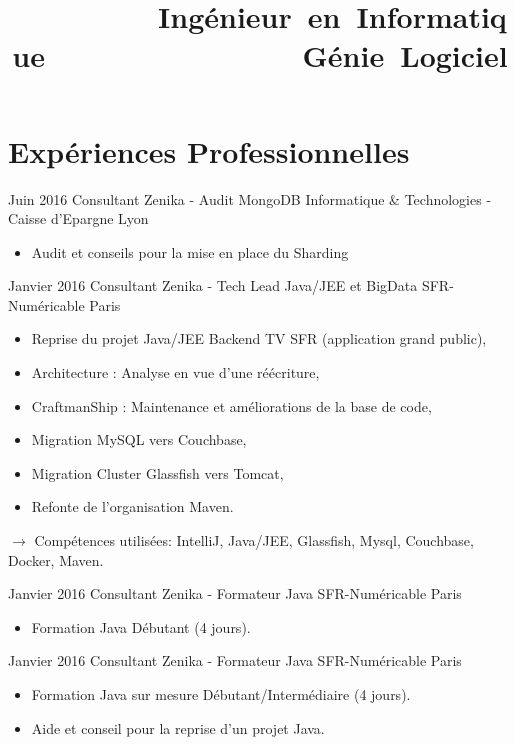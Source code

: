 \documentclass[11pt,a4paper]{moderncv}
\title{\mbox{~~~~~~~~~Ingénieur en Informatique}\newline\mbox{~~~~~~~~~~~~~~~~Génie Logiciel}} %
\begin{document}
\maketitle

\section{Expériences Professionnelles}

\cventry
{Juin 2016}
{Consultant Zenika - Audit MongoDB}
{Informatique \& Technologies - Caisse d'Epargne}
{Lyon}
{}
{\begin{itemize}
\item Audit et conseils pour la mise en place du Sharding 
\end{itemize}
}   %

\cventry
{Janvier 2016}
{Consultant Zenika - Tech Lead Java/JEE et BigData}
{SFR-Numéricable}
{Paris}
{}
{\begin{itemize}
\item Reprise du projet Java/JEE Backend TV SFR (application grand public),
\item Architecture : Analyse en vue d'une réécriture,
\item CraftmanShip : Maintenance et améliorations de la base de code,
\item Migration MySQL vers Couchbase,
\item Migration Cluster Glassfish vers Tomcat,
\item Refonte de l'organisation Maven.
\end{itemize}
$\rightarrow$ Compétences utilisées: IntelliJ, Java/JEE, Glassfish, Mysql, Couchbase, Docker, Maven.
}   %

\cventry
{Janvier 2016}
{Consultant Zenika - Formateur Java}
{SFR-Numéricable}
{Paris}
{}
{\begin{itemize}
\item Formation Java Débutant (4 jours).
\end{itemize}
}   %

\cventry
{Janvier 2016}
{Consultant Zenika - Formateur Java}
{SFR-Numéricable}
{Paris}
{}
{\begin{itemize}
\item Formation Java sur mesure Débutant/Intermédiaire (4 jours).
\item Aide et conseil pour la reprise d'un projet Java.
\end{itemize}
}   %
\end{document}
